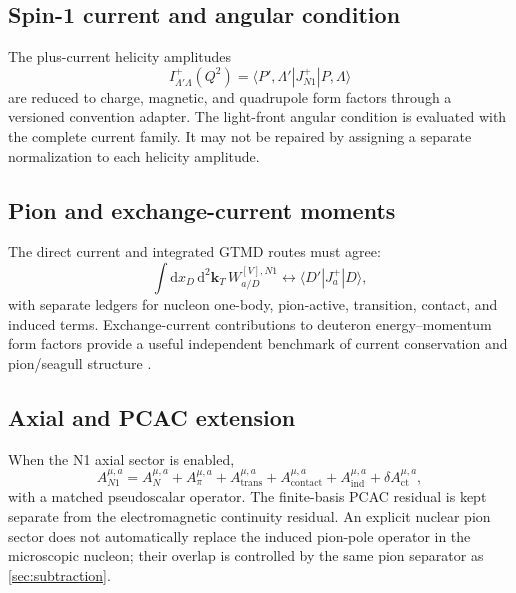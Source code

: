 \documentclass[11pt]{article}
\newcommand{\kT}{\bm{k}_{T}}
\newcommand{\dd}{\mathrm{d}}
\newcommand{\ct}{\mathrm{ct}}
\begin{document}
\subsection{Spin-1 current and angular condition}

The plus-current helicity amplitudes
\begin{equation}
 I_{\Lambda'\Lambda}^{+}(Q^2)
 =\langle P',\Lambda'|J^{+}_{N1}|P,\Lambda\rangle
 \label{eq:n1-current-helicity}
\end{equation}
are reduced to charge, magnetic, and quadrupole form factors through a
versioned convention adapter.  The light-front angular condition is evaluated
with the complete current family.  It may not be repaired by assigning a
separate normalization to each helicity amplitude.

\subsection{Pion and exchange-current moments}

The direct current and integrated GTMD routes must agree:
\begin{equation}
 \int\dd x_D\,\dd^2\kT\,
 W_{a/D}^{[V],N1}
 \longleftrightarrow
 \langle D'|J_a^{+}|D\rangle,
 \label{eq:n1-current-gtmd-closure}
\end{equation}
with separate ledgers for nucleon one-body, pion-active, transition, contact,
and induced terms.  Exchange-current contributions to deuteron energy--momentum
form factors provide a useful independent benchmark of current conservation
and pion/seagull structure \cite{HeZahed2024}.

\subsection{Axial and PCAC extension}

When the N1 axial sector is enabled,
\begin{equation}
 A_{N1}^{\mu,a}
 =A_N^{\mu,a}+A_{\pi}^{\mu,a}
 +A_{\mathrm{trans}}^{\mu,a}
 +A_{\mathrm{contact}}^{\mu,a}
 +A_{\mathrm{ind}}^{\mu,a}
 +\delta A_{\ct}^{\mu,a},
 \label{eq:n1-axial-current}
\end{equation}
with a matched pseudoscalar operator.  The finite-basis PCAC residual is kept
separate from the electromagnetic continuity residual.  An explicit nuclear
pion sector does not automatically replace the induced pion-pole operator in
the microscopic nucleon; their overlap is controlled by the same pion
separator as \cref{sec:subtraction}.
\end{document}
